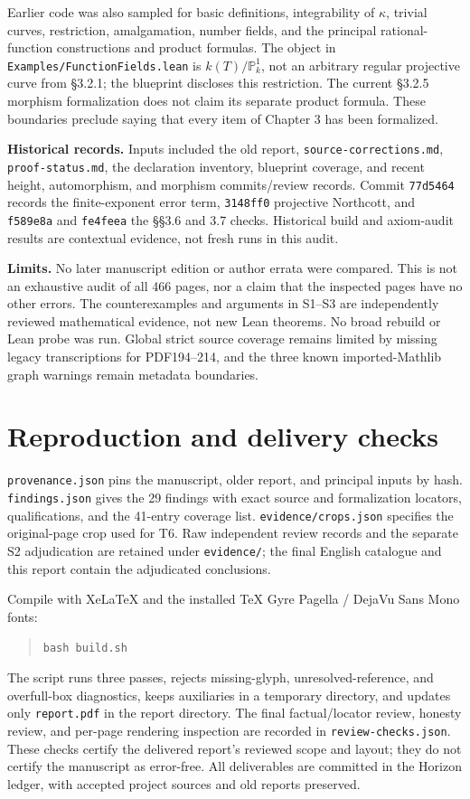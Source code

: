 \documentclass[11pt,a4paper]{article}
\newcommand{\PP}{\mathbb P}
\newcommand{\code}[1]{{\small\nolinkurl{#1}}}
\begin{document}
Earlier code was also sampled for basic definitions, integrability of $\kappa$, trivial curves, restriction, amalgamation, number fields, and the principal rational-function constructions and product formulas. The object in \code{Examples/FunctionFields.lean} is $k(T)/\PP^1_k$, not an arbitrary regular projective curve from \S3.2.1; the blueprint discloses this restriction. The current \S3.2.5 morphism formalization does not claim its separate product formula. These boundaries preclude saying that every item of Chapter 3 has been formalized.

\noindent\textbf{Historical records.}
Inputs included the old report, \code{source-corrections.md}, \code{proof-status.md}, the declaration inventory, blueprint coverage, and recent height, automorphism, and morphism commits/review records.
Commit \code{77d5464} records the finite-exponent error term,
\code{3148ff0} projective Northcott, and \code{f589e8a} and \code{fe4feea} the \S\S3.6 and 3.7 checks.
Historical build and axiom-audit results are contextual evidence, not fresh runs in this audit.

\noindent\textbf{Limits.}
No later manuscript edition or author errata were compared. This is not an exhaustive audit of all 466 pages, nor a claim that the inspected pages have no other errors.
The counterexamples and arguments in S1--S3 are independently reviewed mathematical evidence, not new Lean theorems.
No broad rebuild or Lean probe was run. Global strict source coverage remains limited by missing legacy transcriptions for PDF194--214, and the three known imported-Mathlib graph warnings remain metadata boundaries.

\section{Reproduction and delivery checks}
\code{provenance.json} pins the manuscript, older report, and principal inputs by hash.
\code{findings.json} gives the 29 findings with exact source and formalization locators, qualifications, and the 41-entry coverage list.
\code{evidence/crops.json} specifies the original-page crop used for T6.
Raw independent review records and the separate S2 adjudication are retained under \code{evidence/}; the final English catalogue and this report contain the adjudicated conclusions.

Compile with XeLaTeX and the installed TeX Gyre Pagella / DejaVu Sans Mono fonts:
\begin{quote}\texttt{bash build.sh}\end{quote}
The script runs three passes, rejects missing-glyph, unresolved-reference, and overfull-box diagnostics, keeps auxiliaries in a temporary directory, and updates only \code{report.pdf} in the report directory.
The final factual/locator review, honesty review, and per-page rendering inspection are recorded in \code{review-checks.json}. These checks certify the delivered report's reviewed scope and layout; they do not certify the manuscript as error-free.
All deliverables are committed in the Horizon ledger, with accepted project sources and old reports preserved.
\end{document}
